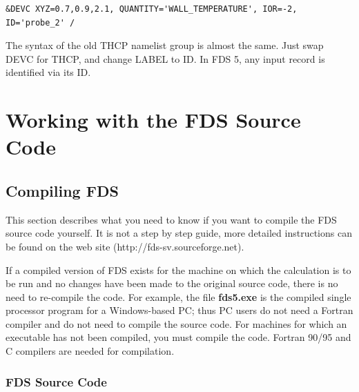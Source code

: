 \documentclass[11pt]{book}
\begin{document}
\footnotesize
\begin{verbatim}
&DEVC XYZ=0.7,0.9,2.1, QUANTITY='WALL_TEMPERATURE', IOR=-2, ID='probe_2' /
\end{verbatim}
\normalsize

\noindent
The syntax of the old {\ct THCP} namelist group is almost the same. Just swap {\ct DEVC} for {\ct THCP}, and change {\ct LABEL} to
{\ct ID}. In FDS 5, any input record is identified via its {\ct ID}.






\part{Working with the FDS Source Code}


\chapter{Compiling FDS}
\label{info:compilation}

This section describes what you need to know if you want to compile the FDS source code yourself.
It is not a step by step guide, more detailed instructions can be found on the web site (http://fds-sv.sourceforge.net).

If a compiled version of FDS exists for the machine on which the
calculation is to be run and no changes have been made to
the original source code, there is no need to re-compile the code.
For example, the file {\bf fds5.exe} is the
compiled single processor program for a Windows-based PC;
thus PC users do not need a
Fortran compiler and do not need to compile the source code.
For machines for which an executable has not been compiled, you must
compile the code. Fortran 90/95 and C compilers are needed for compilation.

\section{FDS Source Code}
\end{document}
